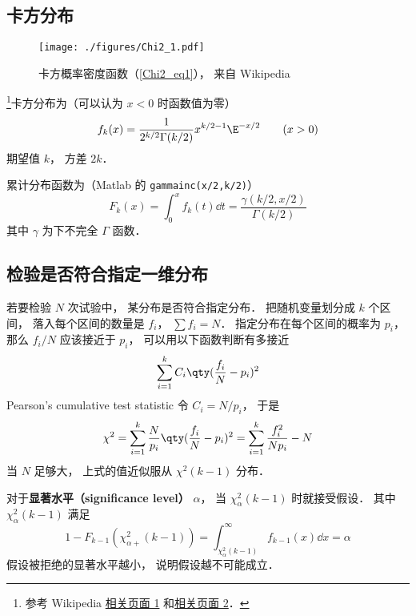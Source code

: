 
\begin{issues}
\issueDraft
\end{issues}

\subsection{卡方分布}
\begin{figure}[ht]
\centering
\texttt{[image: ./figures/Chi2\_1.pdf]}
\caption{卡方概率密度函数（\autoref{Chi2_eq1}）， 来自 Wikipedia} \label{Chi2_fig1}
\end{figure}

\footnote{参考 Wikipedia \href{https://en.wikipedia.org/wiki/Chi-squared_distribution}{相关页面 1} 和\href{https://en.wikipedia.org/wiki/Pearson's_chi-squared_test}{相关页面 2}．}卡方分布为（可以认为 $x<0$ 时函数值为零）
\begin{equation}\label{Chi2_eq1}
f_k(x) = \frac{1}{2^{k/2}\Gamma(k/2)}x^{k/2-1}\E^{-x/2} \qquad (x > 0)
\end{equation}
期望值 $k$， 方差 $2k$．

累计分布函数为（Matlab 的 \verb|gammainc(x/2,k/2)|）
\begin{equation}
F_k(x) = \int_0^{x} f_k(t) \dd{t} = \frac{\gamma(k/2, x/2)}{\Gamma(k/2)}
\end{equation}
其中 $\gamma$ 为下不完全 $\Gamma$ 函数．

\subsection{检验是否符合指定一维分布}
若要检验 $N$ 次试验中， 某分布是否符合指定分布． 把随机变量划分成 $k$ 个区间， 落入每个区间的数量是 $f_i$， $\sum f_i = N$． 指定分布在每个区间的概率为 $p_i$， 那么 $f_i/N$ 应该接近于 $p_i$， 可以用以下函数判断有多接近
\begin{equation}
\sum_{i=1}^k C_i \qty(\frac{f_i}{N} - p_i)^2
\end{equation}
Pearson's cumulative test statistic 令 $C_i = N/p_i$， 于是
\begin{equation}
\chi^2 = \sum_{i=1}^k \frac{N}{p_i} \qty(\frac{f_i}{N} - p_i)^2 = \sum_{i=1}^k \frac{f_i^2}{Np_i} - N
\end{equation}
当 $N$ 足够大， 上式的值近似服从 $\chi^2(k-1)$ 分布．

对于\textbf{显著水平（significance level）} $\alpha$， 当 $\chi_{\alpha}^2(k-1)$ 时就接受假设． 其中 $\chi_{\alpha}^2(k-1)$ 满足
\begin{equation}
1 - F_{k-1}(\chi_{\alpha+}^2(k-1)) = \int_{\chi_{\alpha}^2(k-1)}^\infty f_{k-1}(x) \dd{x} = \alpha
\end{equation}
假设被拒绝的显著水平越小， 说明假设越不可能成立．

